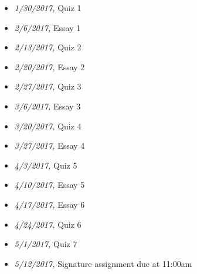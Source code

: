 \documentclass[article,oneside]{memoir}
\begin{document}
\begin{itemize}
\item \textit{1/30/2017,} Quiz 1 
\item \textit{2/6/2017,} Essay 1
\item \textit{2/13/2017,} Quiz 2
\item \textit{2/20/2017,} Essay 2 
\item \textit{2/27/2017,} Quiz 3 
\item \textit{3/6/2017,}  Essay 3
\item \textit{3/20/2017,} Quiz 4
\item \textit{3/27/2017,}  Essay 4
\item \textit{4/3/2017,} Quiz 5
\item \textit{4/10/2017,} Essay 5 
\item \textit{4/17/2017,} Essay 6
\item \textit{4/24/2017,} Quiz 6  
\item \textit{5/1/2017,} Quiz 7
\item \textit{5/12/2017,} Signature assignment due at 11:00am
\end{itemize}


\end{document}
